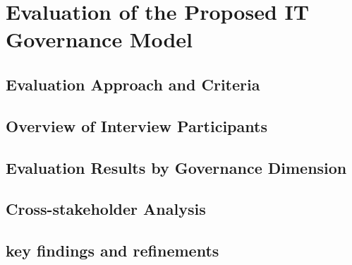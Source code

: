 \section{Evaluation of the Proposed IT Governance Model}
\label{sec:EvaluationOfTheProposedITGovernanceModel}

\subsection{Evaluation Approach and Criteria}
\label{subsec:EvaluationApproachAndCriteria}

\subsection{Overview of Interview Participants}
\label{subsec:OverviewOfInterviewParticipants}

\subsection{Evaluation Results by Governance Dimension}
\label{subsec:EvaluationResultsByGovernanceDimension}

\subsection{Cross-stakeholder Analysis}
\label{subsec:CrossStakeholderAnalysis}

\subsection{key findings and refinements}
\label{subsec:KeyFindingsAndRefinements}
